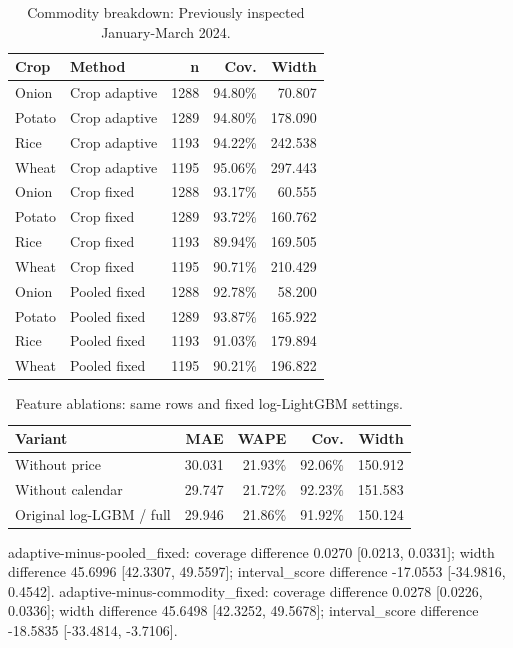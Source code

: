 \documentclass[conference]{IEEEtran}
\begin{document}
\begin{table}[!ht]\centering\scriptsize\caption{Commodity breakdown: Previously inspected January-March 2024.}\begin{tabular}{llrrr}
\toprule
Crop & Method & n & Cov. & Width \\
\midrule
Onion & Crop adaptive & 1288 & 94.80\% & 70.807 \\
Potato & Crop adaptive & 1289 & 94.80\% & 178.090 \\
Rice & Crop adaptive & 1193 & 94.22\% & 242.538 \\
Wheat & Crop adaptive & 1195 & 95.06\% & 297.443 \\
Onion & Crop fixed & 1288 & 93.17\% & 60.555 \\
Potato & Crop fixed & 1289 & 93.72\% & 160.762 \\
Rice & Crop fixed & 1193 & 89.94\% & 169.505 \\
Wheat & Crop fixed & 1195 & 90.71\% & 210.429 \\
Onion & Pooled fixed & 1288 & 92.78\% & 58.200 \\
Potato & Pooled fixed & 1289 & 93.87\% & 165.922 \\
Rice & Pooled fixed & 1193 & 91.03\% & 179.894 \\
Wheat & Pooled fixed & 1195 & 90.21\% & 196.822 \\
\bottomrule
\end{tabular}
\end{table}
\begin{table}[!ht]\centering\small\caption{Feature ablations: same rows and fixed log-LightGBM settings.}\begin{tabular}{lrrrr}
\toprule
Variant & MAE & WAPE & Cov. & Width \\
\midrule
Without price & 30.031 & 21.93\% & 92.06\% & 150.912 \\
Without calendar & 29.747 & 21.72\% & 92.23\% & 151.583 \\
Original log-LGBM / full & 29.946 & 21.86\% & 91.92\% & 150.124 \\
\bottomrule
\end{tabular}
\end{table}
adaptive-minus-pooled\_fixed: coverage difference 0.0270 [0.0213, 0.0331]; width difference 45.6996 [42.3307, 49.5597]; interval\_score difference -17.0553 [-34.9816, 0.4542].
adaptive-minus-commodity\_fixed: coverage difference 0.0278 [0.0226, 0.0336]; width difference 45.6498 [42.3252, 49.5678]; interval\_score difference -18.5835 [-33.4814, -3.7106].
\end{document}
